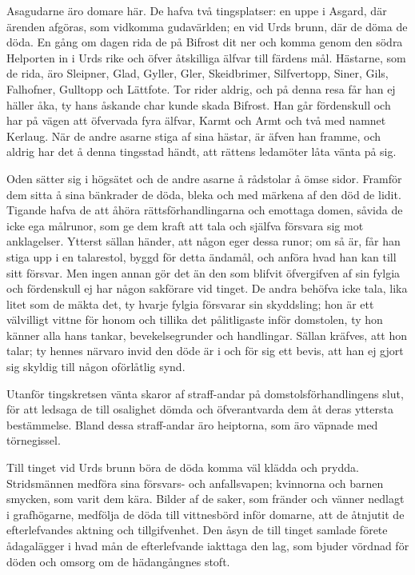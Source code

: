 Asagudarne äro domare här. De hafva två tingsplatser: en uppe i Asgard,
där ärenden afgöras, som vidkomma gudavärlden; en vid Urds brunn, där de
döma de döda. En gång om dagen rida de på Bifrost dit ner och komma
genom den södra Helporten in i Urds rike och öfver åtskilliga älfvar
till färdens mål. Hästarne, som de rida, äro Sleipner, Glad, Gyller,
Gler, Skeidbrimer, Silfvertopp, Siner, Gils, Falhofner, Gulltopp och
Lättfote. Tor rider aldrig, och på denna resa får han ej häller åka, ty
hans åskande char kunde skada Bifrost. Han går fördenskull och har på
vägen att öfvervada fyra älfvar, Karmt och Armt och två med namnet
Kerlaug. När de andre asarne stiga af sina hästar, är äfven han framme,
och aldrig har det å denna tingsstad händt, att rättens ledamöter låta
vänta på sig.

Oden sätter sig i högsätet och de andre asarne å rådstolar å ömse sidor.
Framför dem sitta å sina bänkrader de döda, bleka och med märkena af den
död de lidit. Tigande hafva de att åhöra rättsförhandlingarna och
emottaga domen, såvida de icke ega målrunor, som ge dem kraft att tala
och själfva försvara sig mot anklagelser. Ytterst sällan händer, att
någon eger dessa runor; om så är, får han stiga upp i en talarestol,
byggd för detta ändamål, och anföra hvad han kan till sitt försvar. Men
ingen annan gör det än den som blifvit öfvergifven af sin fylgia och
fördenskull ej har någon sakförare vid tinget. De andra behöfva icke
tala, lika litet som de mäkta det, ty hvarje fylgia försvarar sin
skyddsling; hon är ett välvilligt vittne för honom och tillika det
pålitligaste inför domstolen, ty hon känner alla hans tankar,
bevekelsegrunder och handlingar. Sällan kräfves, att hon talar; ty
hennes närvaro invid den döde är i och för sig ett bevis, att han ej
gjort sig skyldig till någon oförlåtlig synd.

Utanför tingskretsen vänta skaror af straff-andar på
domstolsförhandlingens slut, för att ledsaga de till osalighet dömda och
öfverantvarda dem åt deras yttersta bestämmelse. Bland dessa
straff-andar äro heiptorna, som äro väpnade med törnegissel.

Till tinget vid Urds brunn böra de döda komma väl klädda och prydda.
Stridsmännen medföra sina försvars- och anfallsvapen; kvinnorna och
barnen smycken, som varit dem kära. Bilder af de saker, som fränder och
vänner nedlagt i grafhögarne, medfölja de döda till vittnesbörd inför
domarne, att de åtnjutit de efterlefvandes aktning och tillgifvenhet.
Den åsyn de till tinget samlade förete ådagalägger i hvad mån de
efterlefvande iakttaga den lag, som bjuder vördnad för döden och omsorg
om de hädangångnes stoft.

